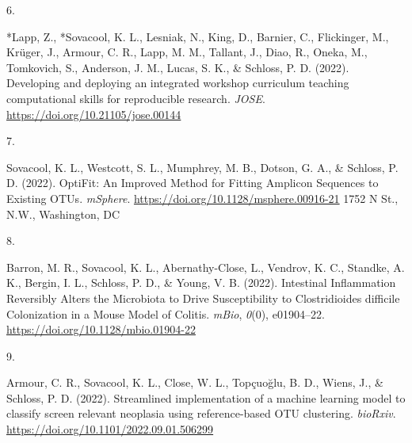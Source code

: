 \documentclass[12pt,a4paper,]{moderncv}
\newlength{\csllabelwidth}
\newcommand{\CSLBlock}[1]{#1\hfill\break}
\newcommand{\CSLLeftMargin}[1]{\parbox[t]{\csllabelwidth}{#1}}
\newcommand{\CSLRightInline}[1]{\parbox[t]{\linewidth - \csllabelwidth}{#1}}
\begin{document}
\leavevmode{}%
\CSLLeftMargin{6. }%
\CSLRightInline{*Lapp, Z., *Sovacool, K. L., Lesniak, N., King, D.,
Barnier, C., Flickinger, M., Krüger, J., Armour, C. R., Lapp, M. M.,
Tallant, J., Diao, R., Oneka, M., Tomkovich, S., Anderson, J. M., Lucas,
S. K., \& Schloss, P. D. (2022). Developing and deploying an integrated
workshop curriculum teaching computational skills for reproducible
research. \emph{JOSE}. \url{https://doi.org/10.21105/jose.00144}}

\leavevmode{}%
\CSLLeftMargin{7. }%
\CSLRightInline{Sovacool, K. L., Westcott, S. L., Mumphrey, M. B.,
Dotson, G. A., \& Schloss, P. D. (2022). OptiFit: An Improved Method for
Fitting Amplicon Sequences to Existing OTUs. \emph{mSphere}.
\url{https://doi.org/10.1128/msphere.00916-21}
\CSLBlock{1752 N St., N.W., Washington, DC}}

\leavevmode{}%
\CSLLeftMargin{8. }%
\CSLRightInline{Barron, M. R., Sovacool, K. L., Abernathy-Close, L.,
Vendrov, K. C., Standke, A. K., Bergin, I. L., Schloss, P. D., \& Young,
V. B. (2022). Intestinal Inflammation Reversibly Alters the Microbiota
to Drive Susceptibility to Clostridioides difficile Colonization in a
Mouse Model of Colitis. \emph{mBio}, \emph{0}(0), e01904--22.
\url{https://doi.org/10.1128/mbio.01904-22}}

\leavevmode{}%
\CSLLeftMargin{9. }%
\CSLRightInline{Armour, C. R., Sovacool, K. L., Close, W. L., Topçuoğlu,
B. D., Wiens, J., \& Schloss, P. D. (2022). Streamlined implementation
of a machine learning model to classify screen relevant neoplasia using
reference-based OTU clustering. \emph{bioRxiv}.
\url{https://doi.org/10.1101/2022.09.01.506299}}
\end{document}
